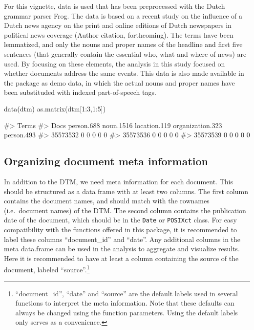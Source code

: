For this vignette, data is used that has been preprocessed with the
Dutch grammar parser Frog. The data is based on a recent study on the
influence of a Dutch news agency on the print and online editions of
Dutch newspapers in political news coverage (Author citation,
forthcoming). The terms have been lemmatized, and only the nouns and
proper names of the headline and first five sentences (that generally
contain the essential who, what and where of news) are used. By focusing
on these elements, the analysis in this study focused on whether
documents address the same events. This data is also made available in
the package as demo data, in which the actual nouns and proper names
have been substituded with indexed part-of-speech tags.

\begin{Schunk}
\begin{Sinput}
data(dtm)
as.matrix(dtm[1:3,1:5])
\end{Sinput}
\begin{Soutput}
#>           Terms
#> Docs       person.688 noun.1516 location.119 organization.323 person.493
#>   35573532          0         0            0                0          0
#>   35573536          0         0            0                0          0
#>   35573539          0         0            0                0          0
\end{Soutput}
\end{Schunk}

\subsection{Organizing document meta information}

In addition to the DTM, we need meta information for each document. This
should be structured as a data frame with at least two columns. The
first column contains the document names, and should match with the
rownames (i.e.~document names) of the DTM. The second column contains
the publication date of the document, which should be in the
\texttt{Date} or \texttt{POSIXct} class. For easy compatibility with the
functions offered in this package, it is recommended to label these
columns ``document\_id'' and ``date''. Any additional columns in the
meta data.frame can be used in the analysis to aggregate and visualize
results. Here it is recommended to have at least a column containing the
source of the document, labeled ``source''.\footnote{``document\_id'',
  ``date'' and ``source'' are the default labels used in several
  functions to interpret the meta information. Note that these defaults
  can always be changed using the function parameters. Using the default
  labels only serves as a convenience.}

